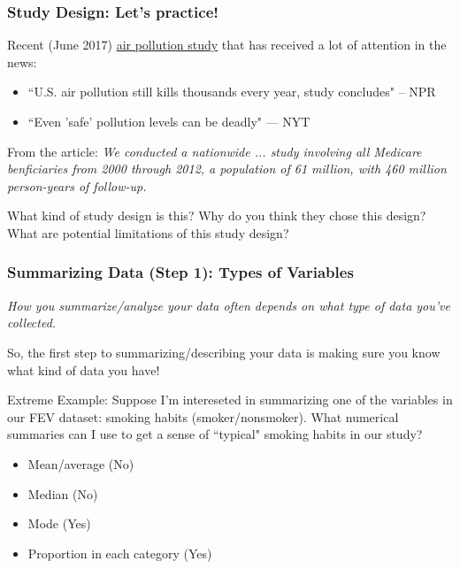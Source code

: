 \documentclass[12pt, 
hyperref={colorlinks=true, linkcolor=blue, urlcolor=cyan}]{beamer}
\begin{document}
\begin{frame}
\frametitle{Study Design: Let's practice!}

Recent (June 2017) \href{http://www.nejm.org/doi/10.1056/NEJMoa1702747}{air pollution study} that has received a lot of attention in the news: \vspace{-0.3cm}
\begin{itemize} %
\item ``U.S. air pollution still kills thousands every year, study concludes" -- NPR
\item ``Even 'safe' pollution levels can be deadly" --- NYT
\end{itemize}

From the article: \textit{We conducted a nationwide ... study involving all Medicare benficiaries from 2000 through 2012, a population of 61 million, with 460 million person-years of follow-up.}

\begin{small} \color{blue} What kind of study design is this? Why do you think they chose this design? What are potential limitations of this study design? \color{black} \end{small} %
\end{frame}

\begin{frame}
\frametitle{Summarizing Data (Step 1): Types of Variables} %

\textit{How you summarize/analyze your data often depends on what type of data you've collected.} 

So, the first step to summarizing/describing your data is making sure you know what kind of data you have!

\color{blue} Extreme Example: \color{black} Suppose I'm intereseted in summarizing one of the variables in our FEV dataset: smoking habits (smoker/nonsmoker).  What numerical summaries can I use to get a sense of ``typical" smoking habits in our study? \vspace{-0.3cm}
\begin{itemize} %
\item Mean/average \pause \color{red} (No) \color{black}
\item Median \pause \color{red} (No) \color{black}
\item Mode \pause \color{red} (Yes) \color{black}
\item Proportion in each category \pause \color{red} (Yes) \color{black}
\end{itemize}
\end{frame}
\end{document}
